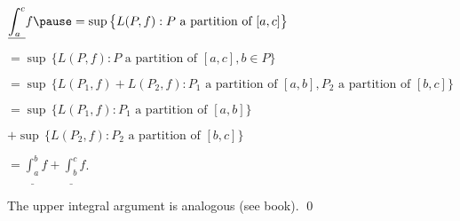 \documentclass[10pt,aspectratio=169]{beamer}
\begin{document}
\begin{frame}

$\displaystyle
\underline{\int_a^c} f
\pause
=
\sup \, \bigl\{ L(P,f) : P \text{ a partition of } [a,c] \bigr\}
$

\pause
\medskip

\qquad
$\displaystyle
=
\sup \, \bigl\{ L(P,f) : P \text{ a partition of } [a,c], b \in P \bigr\}
$

\pause
\medskip

\qquad
$\displaystyle
=
\sup \, \bigl\{ L(P_1,f) + L(P_2,f) :
P_1 \text{ a partition of } [a,b], P_2 \text{ a partition of } [b,c] \bigr\}
$

\pause
\medskip

\qquad
$\displaystyle
=
\sup \, \bigl\{ L(P_1,f) : P_1 \text{ a partition of } [a,b] \bigr\}
$

\medskip

\qquad\qquad
$\displaystyle
+
\sup \, \bigl\{ L(P_2,f) : P_2 \text{ a partition of } [b,c] \bigr\}
$

\pause
\medskip

\qquad
$\displaystyle
=
\underline{\int_a^b} f + \underline{\int_b^c} f$.

\pause
\medskip

The upper integral argument is analogous (see book).
\qed

\end{frame}
\end{document}
